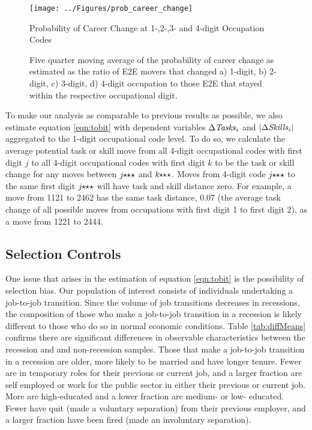 \documentclass[11pt, oneside]{article}
\begin{document}
\begin{figure}[h]
	\centering
	\texttt{[image: ../Figures/prob\_career\_change]}
	\caption{Probability of Career Change at 1-,2-,3- and 4-digit Occupation Codes}
	\caption*{\small{Five quarter moving average of the probability of career change as estimated as the ratio of E2E movers that changed a) 1-digit, b) 2-digit, c) 3-digit, d) 4-digit occupation to those E2E that stayed within the respective occupational digit.}}
	\label{fig:probCareerChange}
\end{figure}

To make our analysis as comparable to previous results as possible, we also estimate equation \ref{eqn:tobit} with dependent variables  $\Delta\text{\textit{Tasks}}_{i}$ and $|\Delta\text{\textit{Skills}}_{i}|$ aggregated to the 1-digit occupational code level. To do so, we calculate the average potential task or skill move from all 4-digit occupational codes with first digit $j$ to all 4-digit occupational codes with first digit $k$ to be the task or skill change for any moves between $j\hspace{-1mm}\star\hspace{-1mm}\star\star$ and $k\hspace{-1mm}\star\hspace{-1mm}\star\star$. Moves from 4-digit code $j\hspace{-1mm}\star\hspace{-1mm}\star\star$ to the same first digit $j\hspace{-1mm}\star\hspace{-1mm}\star\star$ will have task and skill distance zero. For example, a move from 1121 to 2462 has the same task distance, 0.07 (the average task change of all possible moves from occupations with first digit 1 to first digit 2), as a move from 1221 to 2444.

\subsection{Selection Controls}

One issue that arises in the estimation of equation \ref{eqn:tobit}  is the possibility of selection bias. Our population of interest consists of individuals undertaking a job-to-job transition. Since the volume of job transitions decreases in recessions, the composition of those who make a job-to-job transition in a recession is likely different to those who do so in normal economic conditions. Table \ref{tab:diffMeans} confirms there are significant differences in observable characteristics between the recession and and non-recession samples. Those that make a job-to-job transition in a recession are older, more likely to be married and have longer tenure. Fewer are in temporary roles for their previous or current job, and a larger fraction are self employed or work for the public sector in either their previous or current job. More are high-educated and a lower fraction are medium- or low- educated. Fewer have quit (made a voluntary separation) from their previous employer, and a larger fraction have been fired (made an involuntary separation).  
\end{document}
